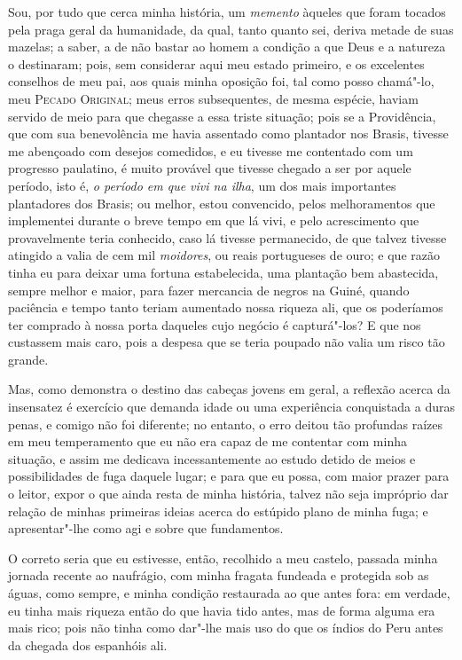 Sou, por tudo que cerca minha história, um \emph{memento} àqueles que
foram tocados pela praga geral da humanidade, da qual, tanto quanto sei,
deriva metade de suas mazelas; a saber, a de não bastar ao homem a
condição a que Deus e a natureza o destinaram; pois, sem considerar aqui
meu estado primeiro, e os excelentes conselhos de meu pai, aos quais
minha oposição foi, tal como posso chamá"-lo, meu \textsc{Pecado
Original}; meus erros subsequentes, de mesma espécie, haviam servido de
meio para que chegasse a essa triste situação; pois se a Providência,
que com sua benevolência me havia assentado como plantador nos Brasis,
tivesse me abençoado com desejos comedidos, e eu tivesse me contentado
com um progresso paulatino, é muito provável que tivesse chegado a ser
por aquele período, isto é, \emph{o período em que vivi na ilha}, um dos
mais importantes plantadores dos Brasis; ou melhor, estou convencido,
pelos melhoramentos que implementei durante o breve tempo em que lá
vivi, e pelo acrescimento que provavelmente teria conhecido, caso lá
tivesse permanecido, de que talvez tivesse atingido a valia de cem mil
\emph{moidores}, ou reais portugueses de ouro; e que razão tinha eu para
deixar uma fortuna estabelecida, uma plantação bem abastecida, sempre
melhor e maior, para fazer mercancia de negros na Guiné, quando
paciência e tempo tanto teriam aumentado nossa riqueza ali, que os
poderíamos ter comprado à nossa porta daqueles cujo negócio é
capturá"-los? E que nos custassem mais caro, pois a despesa que se teria
poupado não valia um risco tão grande.

Mas, como demonstra o destino das cabeças jovens em geral, a reflexão
acerca da insensatez é exercício que demanda idade ou uma experiência
conquistada a duras penas, e comigo não foi diferente; no entanto, o
erro deitou tão profundas raízes em meu temperamento que eu não era
capaz de me contentar com minha situação, e assim me dedicava
incessantemente ao estudo detido de meios e possibilidades de fuga
daquele lugar; e para que eu possa, com maior prazer para o leitor,
expor o que ainda resta de minha história, talvez não seja impróprio dar
relação de minhas primeiras ideias acerca do estúpido plano de minha
fuga; e apresentar"-lhe como agi e sobre que fundamentos.

O correto seria que eu estivesse, então, recolhido a meu castelo,
passada minha jornada recente ao naufrágio, com minha fragata fundeada e
protegida sob as águas, como sempre, e minha condição restaurada ao que
antes fora: em verdade, eu tinha mais riqueza então do que havia tido
antes, mas de forma alguma era mais rico; pois não tinha como dar"-lhe
mais uso do que os índios do Peru antes da chegada dos espanhóis ali.

